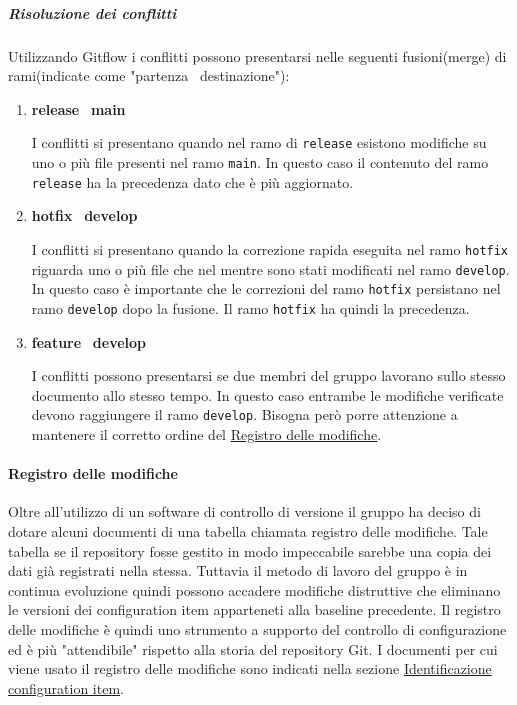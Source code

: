 \subparagraph{Risoluzione dei conflitti}
\label{subpar:risoluzione_dei_conflitti}
Utilizzando Gitflow i conflitti possono presentarsi nelle seguenti fusioni(merge) di rami(indicate come "partenza \textrightarrow\ destinazione"):
\begin{enumerate}
    \item \textbf{release} \textrightarrow\ \textbf{main}
    
    I conflitti si presentano quando nel ramo di \texttt{release} esistono modifiche su uno o più file presenti nel ramo \texttt{main}.
    In questo caso il contenuto del ramo \texttt{release} ha la precedenza dato che è più aggiornato.
    
    \item \textbf{hotfix} \textrightarrow\ \textbf{develop}
    
    I conflitti si presentano quando la correzione rapida eseguita nel ramo \texttt{hotfix} riguarda uno o più file che nel mentre sono stati modificati nel ramo \texttt{develop}.
    In questo caso è importante che le correzioni del ramo \texttt{hotfix} persistano nel ramo \texttt{develop} dopo la fusione.
    Il ramo \texttt{hotfix} ha quindi la precedenza.   


    \item \textbf{feature} \textrightarrow\ \textbf{develop}
   
    I conflitti possono presentarsi se due membri del gruppo lavorano sullo stesso documento allo stesso tempo.
    In questo caso entrambe le modifiche verificate devono raggiungere il ramo \texttt{develop}.
    Bisogna però porre attenzione a mantenere il corretto ordine del \hyperref[par:registro_delle_modifiche]{Registro delle modifiche}.
\end{enumerate}


\paragraph{Registro delle modifiche}
\label{par:registro_delle_modifiche}
Oltre all'utilizzo di un software di controllo di versione il gruppo ha deciso di dotare alcuni documenti di una tabella chiamata registro delle modifiche.
Tale tabella se il repository fosse gestito in modo impeccabile sarebbe una copia dei dati già registrati nella stessa.
Tuttavia il metodo di lavoro del gruppo è in continua evoluzione quindi possono accadere modifiche distruttive che eliminano le versioni dei configuration item apparteneti alla baseline precedente.
Il registro delle modifiche è quindi uno strumento a supporto del controllo di configurazione ed è più "attendibile" rispetto alla storia del repository Git.
I documenti per cui viene usato il registro delle modifiche sono indicati nella sezione \hyperref[subsubsec:identificazione_CI]{Identificazione configuration item}.

